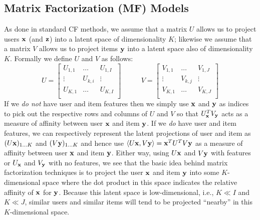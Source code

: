 \begin{comment}
This applies to the MovieLens 1 Million dataset as well. For the MovieLens 100,000 dataset, the number of items is larger than the number of users, and the user-based approach has been found to perform better.
\end{comment}

\subsection{Matrix Factorization (MF) Models}
\label{sec:mf}

As done in standard CF methods, we assume that
a matrix $U$ allows us to project users $\mathbf{x}$ (and $\mathbf{z}$)
into a latent space of dimensionality $K$; likewise we assume that
a matrix $V$ allows us to project items $\mathbf{y}$ into a latent
space also of dimensionality $K$.  Formally we define $U$ and $V$
as follows:
\begin{equation*}
U = 
\begin{bmatrix}
  U_{1,1} & \hdots  & U_{1,I} \\
  \vdots  & U_{k,i} & \vdots  \\
  U_{K,1} & \hdots  & U_{K,I} \\
\end{bmatrix}
\qquad \; \; \;
V = 
\begin{bmatrix}
  V_{1,1} & \hdots  & V_{1,J} \\
  \vdots  & V_{k,j} & \vdots  \\
  V_{K,1} & \hdots  & V_{K,J} \\
\end{bmatrix}
\end{equation*}
If we \emph{do not} have user and item features then we simply use
$\mathbf{x}$ and $\mathbf{y}$ as indices to pick out the respective rows and columns
of $U$ and $V$ so that $U_{\mathbf{x}}^T V_{\mathbf{y}}$ acts as a measure of affinity 
between user $\mathbf{x}$ and item $\mathbf{y}$.  If we \emph{do} have user and item
features, we can respectively represent the latent projections of user
and item as $(U \mathbf{x})_{1 \ldots K}$ and $(V \mathbf{y})_{1 \ldots K}$ and hence
use $\langle U \mathbf{x}, V \mathbf{y} \rangle = \mathbf{x}^T U^T V \mathbf{y}$ as a measure of affinity 
between user $\mathbf{x}$ and item $\mathbf{y}$.  Either way, using $U \mathbf{x}$ and $V \mathbf{y}$
with features or $U_{\mathbf{x}}$ and $V_{\mathbf{y}}$ with no features, we see that the
basic idea behind matrix factorization techniques is to project the
user $\mathbf{x}$ and item $\mathbf{y}$ into some $K$-dimensional space where the dot
product in this space indicates the relative affinity of $\mathbf{x}$ for
$\mathbf{y}$.  Because this latent space is low-dimensional, i.e., $K \ll
I$ and $K \ll J$, similar users and similar items will tend to be
projected ``nearby'' in this $K$-dimensional space.

